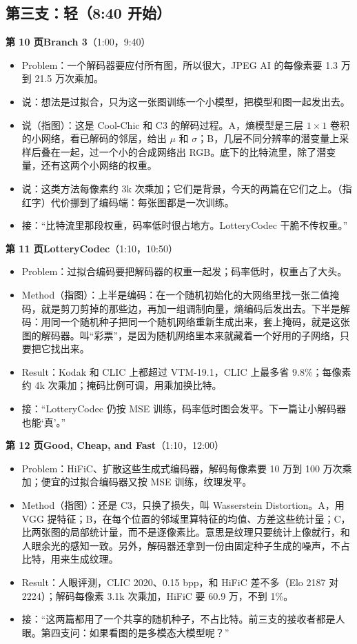 \subsection*{\textcolor{video}{第三支：轻}（8:40 开始）}

\textbf{第 10 页\quad Branch 3}（1:00，9:40）
\begin{itemize}
  \item Problem：一个解码器要应付所有图，所以很大，JPEG AI 的每像素要 1.3 万到 21.5 万次乘加。
  \item 说：想法是过拟合，只为这一张图训练一个小模型，把模型和图一起发出去。
  \item 说（指图）：这是 Cool-Chic 和 C3 的解码过程。A，熵模型是三层 $1\times1$ 卷积的小网络，看已解码的邻居，给出 $\mu$ 和 $\sigma$；B，几层不同分辨率的潜变量上采样后叠在一起，过一个小的合成网络出 RGB。底下的比特流里，除了潜变量，还有这两个小网络的权重。
  \item 说：这类方法每像素约 3k 次乘加；它们是背景，今天的两篇在它们之上。（指红字）代价挪到了编码端：每张图都是一次训练。
  \item 接：“比特流里那段权重，码率低时很占地方。LotteryCodec 干脆不传权重。”
\end{itemize}

\textbf{第 11 页\quad LotteryCodec}（1:10，10:50）
\begin{itemize}
  \item Problem：过拟合编码要把解码器的权重一起发；码率低时，权重占了大头。
  \item Method（指图）：上半是编码：在一个随机初始化的大网络里找一张二值掩码，就是剪刀剪掉的那些边，再加一组调制向量，熵编码后发出去。下半是解码：用同一个随机种子把同一个随机网络重新生成出来，套上掩码，就是这张图的解码器。叫“彩票”，是因为随机网络里本来就藏着一个好用的子网络，只要把它找出来。
  \item Result：Kodak 和 CLIC 上都超过 VTM-19.1，CLIC 上最多省 9.8\%；每像素约 4k 次乘加；掩码比例可调，用乘加换比特。
  \item 接：“LotteryCodec 仍按 MSE 训练，码率低时图会发平。下一篇让小解码器也能‘真’。”
\end{itemize}

\textbf{第 12 页\quad Good, Cheap, and Fast}（1:10，12:00）
\begin{itemize}
  \item Problem：HiFiC、扩散这些生成式编码器，解码每像素要 10 万到 100 万次乘加；便宜的过拟合编码器又按 MSE 训练，纹理发平。
  \item Method（指图）：还是 C3，只换了损失，叫 Wasserstein Distortion。A，用 VGG 提特征；B，在每个位置的邻域里算特征的均值、方差这些统计量；C，比两张图的局部统计量，而不是逐像素比。意思是纹理只要统计上像就行，和人眼余光的感知一致。另外，解码器还拿到一份由固定种子生成的噪声，不占比特，用来生成纹理。
  \item Result：人眼评测，CLIC 2020、0.15 bpp，和 HiFiC 差不多（Elo 2187 对 2224）；解码每像素 3.1k 次乘加，HiFiC 要 60.9 万，不到 1\%。
  \item 接：“这两篇都用了一个共享的随机种子，不占比特。前三支的接收者都是人眼。第四支问：如果看图的是多模态大模型呢？”
\end{itemize}

